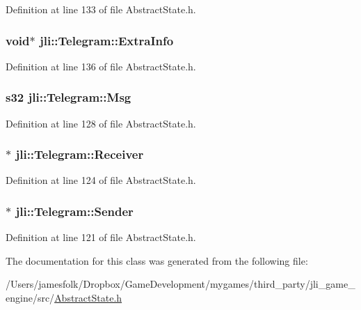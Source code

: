 Definition at line 133 of file Abstract\+State.\+h.

\hypertarget{classjli_1_1_telegram_a8ab71bba704b1f118d4d4863dbc93974}{
\subsubsection[{Extra\+Info}]{\setlength{\rightskip}{0pt plus 5cm}void$\ast$ jli\+::\+Telegram\+::\+Extra\+Info}}\label{classjli_1_1_telegram_a8ab71bba704b1f118d4d4863dbc93974}


Definition at line 136 of file Abstract\+State.\+h.

\hypertarget{classjli_1_1_telegram_a9a8225da9970a32ede98dc78878b31bc}{
\subsubsection[{Msg}]{\setlength{\rightskip}{0pt plus 5cm}s32 jli\+::\+Telegram\+::\+Msg}}\label{classjli_1_1_telegram_a9a8225da9970a32ede98dc78878b31bc}


Definition at line 128 of file Abstract\+State.\+h.

\hypertarget{classjli_1_1_telegram_a32cc7c9021bcf0b3dc32790c282cbe73}{
\subsubsection[{Receiver}]{$\ast$ jli\+::\+Telegram\+::\+Receiver}}\label{classjli_1_1_telegram_a32cc7c9021bcf0b3dc32790c282cbe73}


Definition at line 124 of file Abstract\+State.\+h.

\hypertarget{classjli_1_1_telegram_ad4088edaa292abb81a48c26a898addb8}{
\subsubsection[{Sender}]{$\ast$ jli\+::\+Telegram\+::\+Sender}}\label{classjli_1_1_telegram_ad4088edaa292abb81a48c26a898addb8}


Definition at line 121 of file Abstract\+State.\+h.



The documentation for this class was generated from the following file\+:\begin{DoxyCompactItemize}
\item 
/\+Users/jamesfolk/\+Dropbox/\+Game\+Development/mygames/third\+\_\+party/jli\+\_\+game\+\_\+engine/src/\hyperlink{_abstract_state_8h}{Abstract\+State.\+h}\end{DoxyCompactItemize}

